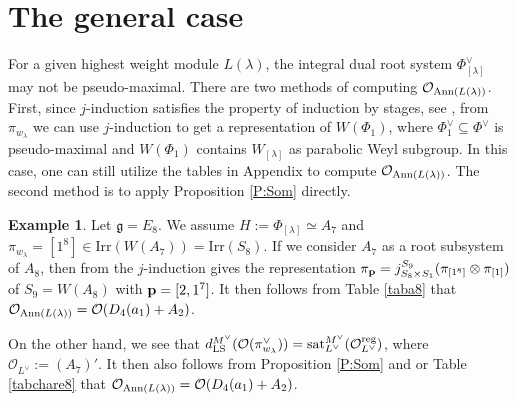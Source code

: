 \documentclass[reqno,12pt]{amsart}
\numberwithin{equation}{section}
\theoremstyle{plain}
\theoremstyle{definition}
\newtheorem{ex}[Thm]{Example}
\newcommand{\lam}{\lambda}
\renewcommand{\subset}{\subseteq}
\begin{document}
\section{The general case } \label{S:gen}


  For a given highest weight module $L(\lambda)$, the integral dual root system  $\Phi_{[\lam]}^\vee$ may not be pseudo-maximal. There are two methods of computing $\mathcal{O}_{{\rm Ann}(L(\lambda))}$. First, since $j$-induction satisfies the property of induction by stages, see \cite[Proposition 11.2.4]{Ca85}, from  $\pi_{w_{\lambda}}$ we can use $j$-induction to get a representation of $W(\Phi_1)$, where $\Phi_1^\vee \subset \Phi^\vee$ is pseudo-maximal and $W(\Phi_1)$ contains $W_{[\lambda]}$ as parabolic Weyl subgroup. In this case, one can still utilize the tables in Appendix to compute $\mathcal{O}_{{\rm Ann}(L(\lambda))}$. The second method is to apply Proposition \ref{P:Som} directly.
\begin{ex}
    Let $\mathfrak{g}=E_8$. We assume $H:=\Phi_{[\lambda]}\simeq A_7$ and $\pi_{w_{\lambda}}=[1^8]\in \mathrm{Irr} (W(A_7))=\mathrm{Irr}(S_8)$. If we consider $A_7$ as a root subsystem of $A_8$, then from \cite{BMW} the $j$-induction gives the representation $\pi_{\bf p}=j_{S_8\times S_1}^{S_9}(\pi_{[1^8]}\otimes\pi_{[1]})$ of $S_9=W(A_8)$ with ${\bf p}=[2,1^7]$. It then follows from Table \ref{taba8} that 
 $\mathcal{O}_{{\rm Ann}(L(\lambda))} = \mathcal{O}(D_4(a_1)+A_2)$.
 
 On the other hand, we see that $d_{\rm LS}^{M^\vee}(\mathcal{O}(\pi_{w_\lambda}^\vee)) = {\rm sat}_{L^\vee}^{M^\vee}(\mathcal{O}_{L^\vee}^{\rm reg})$,
where $\mathcal{O}_{L^\vee}:=(A_7)'$. It then also follows from Proposition \ref{P:Som} and \cite[Table X]{Sommers} or Table \ref{tabchare8} that $\mathcal{O}_{{\rm Ann}(L(\lambda))} = \mathcal{O}(D_4(a_1)+A_2)$.
\end{ex} 
 
\end{document}
